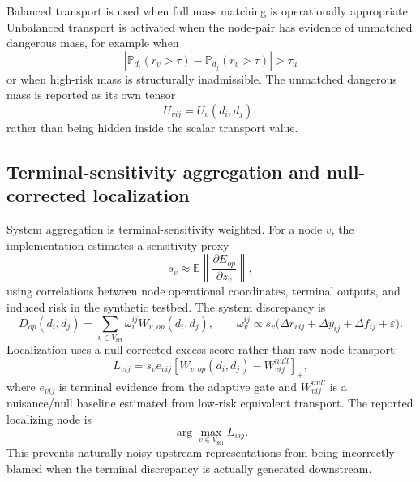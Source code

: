 \documentclass[11pt,a4paper]{article}
\begin{document}
Balanced transport is used when full mass matching is operationally appropriate. Unbalanced transport is activated when the node-pair has evidence of unmatched dangerous mass, for example when
\[
\left|\mathbb P_{d_i}(r_v>\tau)-\mathbb P_{d_j}(r_v>\tau)\right|>\tau_u
\]
or when high-risk mass is structurally inadmissible. The unmatched dangerous mass is reported as its own tensor
\[
U_{vij}=U_v(d_i,d_j),
\]
rather than being hidden inside the scalar transport value.

\subsection*{Terminal-sensitivity aggregation and null-corrected localization}

System aggregation is terminal-sensitivity weighted. For a node \(v\), the implementation estimates a sensitivity proxy
\[
s_v\approx \mathbb E\left\|\frac{\partial E_{op}}{\partial z_v}\right\|,
\]
using correlations between node operational coordinates, terminal outputs, and induced risk in the synthetic testbed. The system discrepancy is
\[
D_{op}(d_i,d_j)=\sum_{v\in V_{\mathrm{sel}}}\omega^{ij}_v W_{v,op}(d_i,d_j),
\qquad
\omega^{ij}_v\propto s_v\bigl(\Delta r_{vij}+\Delta y_{ij}+\Delta f_{ij}+\varepsilon\bigr).
\]
Localization uses a null-corrected excess score rather than raw node transport:
\[
L_{vij}=s_v e_{vij}\left[W_{v,op}(d_i,d_j)-W^{null}_{vij}\right]_+,
\]
where \(e_{vij}\) is terminal evidence from the adaptive gate and \(W^{null}_{vij}\) is a nuisance/null baseline estimated from low-risk equivalent transport. The reported localizing node is
\[
\arg\max_{v\in V_{\mathrm{sel}}}L_{vij}.
\]
This prevents naturally noisy upstream representations from being incorrectly blamed when the terminal discrepancy is actually generated downstream.
\end{document}
